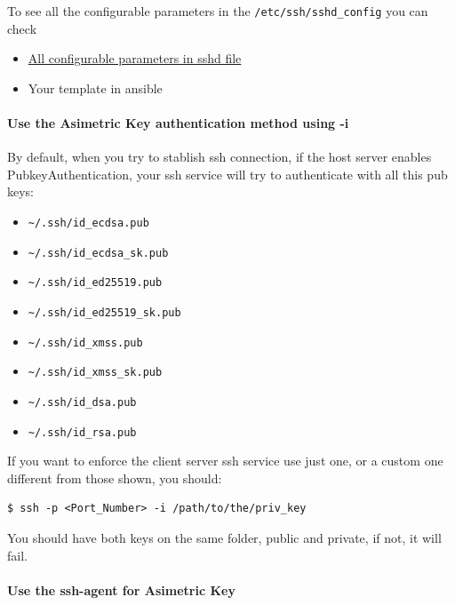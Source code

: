 \documentclass{article}
\newenvironment{blocktemplate}[1]{%
    \tcolorbox[beamer,%
    noparskip,breakable,
    colframe=Blue,%
    colbacklower=LimeGreen!75!LightGreen,%
    title=#1]}%
    {\endtcolorbox}
\newenvironment{codetemplate}[1][]{%
  \mybasecolorbox[#1]
  \itshape
}{%
  \endmybasecolorbox
}
\begin{document}
To see all the configurable parameters in the \verb|/etc/ssh/sshd_config| you can check

\begin{itemize}
    \item \href{https://www.ssh.com/academy/ssh/sshd_config}{All configurable parameters in sshd file}
    \item Your template in ansible
\end{itemize}


\paragraph{Use the Asimetric Key authentication method using -i}

By default, when you try to stablish ssh connection, if the host server enables PubkeyAuthentication, your ssh service will try to authenticate with all this pub keys:
\begin{itemize}
    \item \verb|~/.ssh/id_ecdsa.pub|
    \item \verb|~/.ssh/id_ecdsa_sk.pub|
    \item \verb|~/.ssh/id_ed25519.pub|
    \item \verb|~/.ssh/id_ed25519_sk.pub|
    \item \verb|~/.ssh/id_xmss.pub|
    \item \verb|~/.ssh/id_xmss_sk.pub|
    \item \verb|~/.ssh/id_dsa.pub|
    \item \verb|~/.ssh/id_rsa.pub|
\end{itemize}

If you want to enforce the client server ssh service use just one, or a custom one different from those shown, you should:
\begin{codetemplate}{}
\begin{verbatim}
$ ssh -p <Port_Number> -i /path/to/the/priv_key
\end{verbatim}
\end{codetemplate}

\begin{blocktemplate}{NOTE}
You should have both keys on the same folder, public and private, if not, it will fail.
\end{blocktemplate}

\paragraph{Use the ssh-agent for Asimetric Key}
\end{document}
